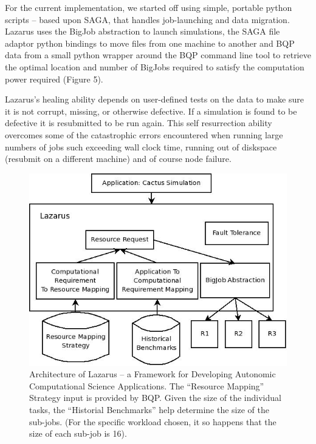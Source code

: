 \documentclass{sig-alternate}
\newcommand{\up}{\vspace*{-0.3em}}
\begin{document}
For the current implementation, we started off using simple, portable
python scripts -- based upon SAGA, that handles job-launching and data
migration. %
Lazarus uses the BigJob abstraction to launch simulations,
the SAGA file adaptor python bindings to move files from one machine
to another and BQP data from a small python wrapper around the BQP
command line tool to retrieve the optimal location and number of
BigJobs required to satisfy the computation power required (Figure 5).

Lazarus's healing ability depends on user-defined tests on the data to
make sure it is not corrupt, missing, or otherwise defective. If a
simulation is found to be defective it is resubmitted to be run
again. This self resurrection ability overcomes some of the
catastrophic errors encountered when running large numbers of jobs
such exceeding wall clock time, running out of diskspace (resubmit on
a different machine) and of course node failure.

\begin{figure}
\begin{center}
\includegraphics[scale=0.4]{./figures/Lazarus_01.jpeg}
\end{center}
\caption{Architecture of Lazarus -- a Framework for Developing
  Autonomic Computational Science Applications. The ``Resource
  Mapping'' Strategy input is provided by BQP. Given the size of the
  individual tasks, the ``Historial Benchmarks'' help determine the
  size of the sub-jobs. (For the specific workload chosen, it so
  happens that the size of each sub-job is 16).}\up\up\up \up\up\up
\label{fig:application_architecture}
\end{figure}
\end{document}
